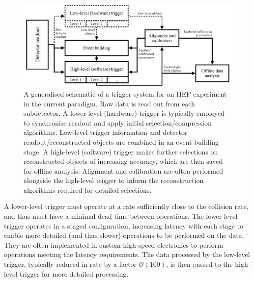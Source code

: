 \begin{figure}[!ht]
    \centering
    \includegraphics[width=\linewidth]{images/trigger_schematic.pdf}
    \caption[A sketch of a trigger system for a  HEP experiment in the current paradigm. Raw data is read out from each subdetector. A low-level (hardware) trigger is typically employed to synchronise readout and apply initial selection/compression algorithms. A high-level (software) trigger makes further selections on reconstructed objects of increasing accuracy, which are then saved for offline analysis. Alignment and calibration are often performed alongside the high-level trigger to inform the reconstruction algorithms required for detailed selections.]{A generalised schematic of a trigger system for an HEP experiment in the current paradigm. Raw data is read out from each subdetector. A lower-level (hardware) trigger is typically employed to synchronise readout and apply initial selection/compression algorithms. Low-level trigger information and detector readout/reconstructed objects are combined in an event building stage. A high-level (software) trigger makes further selections on reconstructed objects of increasing accuracy, which are then saved for offline analysis. Alignment and calibration are often performed alongside the high-level trigger to inform the reconstruction algorithms required for detailed selections.}
    \label{trigger-schema}
\end{figure}


A lower-level trigger must operate at a rate sufficiently close to the collision rate, and thus must have a minimal dead time between operations. 
The lower-level trigger operates in a staged configuration, increasing latency with each stage to enable more detailed (and thus slower) operations to be performed on the data. 
They are often implemented in custom high-speed electronics to perform operations meeting the latency requirements. 
The data processed by the low-level trigger, typically reduced in rate by a factor $\mathcal{O}\left(100\right)$, is then passed to the high-level trigger for more detailed processing.

